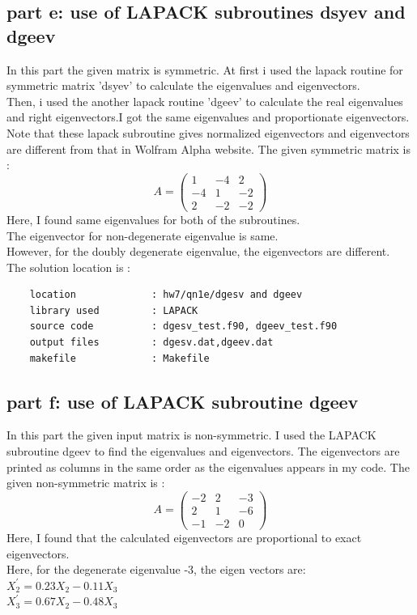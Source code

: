 \documentclass[11pt,a4paper,english]{article}
\begin{document}
	\subsection{part e: use of LAPACK subroutines dsyev and dgeev}
    In this part the given matrix is symmetric. At first i used the lapack routine for symmetric
    matrix 'dsyev' to calculate the eigenvalues and eigenvectors.\\
    Then, i used the another lapack routine 'dgeev' to calculate the real eigenvalues and right 
    eigenvectors.I got the same eigenvalues and proportionate eigenvectors. 
    Note that these lapack subroutine gives normalized eigenvectors and eigenvectors 
    are different from that in Wolfram Alpha website.
    	The given symmetric matrix is :\\
    \begin{displaymath}
      A=
  		\begin{pmatrix}
    			1 & -4 &  2 \\
    		   -4 &  1 & -2 \\
    			2 & -2 & -2 
  		\end{pmatrix}
	\end{displaymath}
	Here, I found same eigenvalues for both of the subroutines.\\
	The eigenvector for non-degenerate eigenvalue is same.\\
	However, for the doubly degenerate eigenvalue, the eigenvectors are different.\\   
    The solution location is :\\
	\begin{verbatim}
	location             : hw7/qn1e/dgesv and dgeev
	library used         : LAPACK
	source code          : dgesv_test.f90, dgeev_test.f90
	output files         : dgesv.dat,dgeev.dat
	makefile             : Makefile
	\end{verbatim}
        
    \subsection{part f: use of LAPACK subroutine dgeev}
    In this part the given input matrix is non-symmetric. I used the LAPACK subroutine dgeev to find the
    eigenvalues and eigenvectors. The eigenvectors are printed as columns in the same order as 
    the eigenvalues appears in my code.
        	The given non-symmetric matrix is :\\
    \begin{displaymath}
      A=
  		\begin{pmatrix}
    			-2 &  2 &  -3 \\
    		     2 &  1 &  -6 \\
    			-1 & -2 &   0 
  		\end{pmatrix}
	\end{displaymath}
	Here, I found that the calculated eigenvectors are proportional to exact eigenvectors.\\
	Here, for the degenerate eigenvalue -3, the eigen vectors are:\\
    $ X_{2}^{'}	= 0.23 X_{2} - 0.11 X_{3} $\\
    $ X_{3}^{'}	= 0.67 X_{2} - 0.48 X_{3} $\\
	
\end{document}

